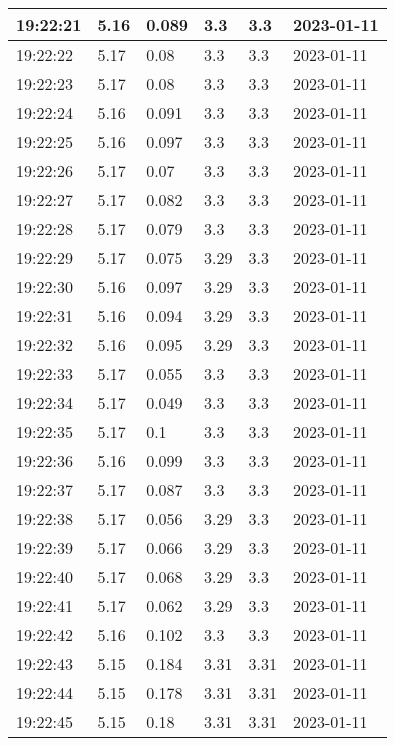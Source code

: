 \begin{longtable}{|l|l|l|l|l|l|}
        19:22:21 & 5.16 & 0.089 & 3.3 & 3.3 & 2023-01-11 \\ \hline
        19:22:22 & 5.17 & 0.08 & 3.3 & 3.3 & 2023-01-11 \\ \hline
        19:22:23 & 5.17 & 0.08 & 3.3 & 3.3 & 2023-01-11 \\ \hline
        19:22:24 & 5.16 & 0.091 & 3.3 & 3.3 & 2023-01-11 \\ \hline
        19:22:25 & 5.16 & 0.097 & 3.3 & 3.3 & 2023-01-11 \\ \hline
        19:22:26 & 5.17 & 0.07 & 3.3 & 3.3 & 2023-01-11 \\ \hline
        19:22:27 & 5.17 & 0.082 & 3.3 & 3.3 & 2023-01-11 \\ \hline
        19:22:28 & 5.17 & 0.079 & 3.3 & 3.3 & 2023-01-11 \\ \hline
        19:22:29 & 5.17 & 0.075 & 3.29 & 3.3 & 2023-01-11 \\ \hline
        19:22:30 & 5.16 & 0.097 & 3.29 & 3.3 & 2023-01-11 \\ \hline
        19:22:31 & 5.16 & 0.094 & 3.29 & 3.3 & 2023-01-11 \\ \hline
        19:22:32 & 5.16 & 0.095 & 3.29 & 3.3 & 2023-01-11 \\ \hline
        19:22:33 & 5.17 & 0.055 & 3.3 & 3.3 & 2023-01-11 \\ \hline
        19:22:34 & 5.17 & 0.049 & 3.3 & 3.3 & 2023-01-11 \\ \hline
        19:22:35 & 5.17 & 0.1 & 3.3 & 3.3 & 2023-01-11 \\ \hline
        19:22:36 & 5.16 & 0.099 & 3.3 & 3.3 & 2023-01-11 \\ \hline
        19:22:37 & 5.17 & 0.087 & 3.3 & 3.3 & 2023-01-11 \\ \hline
        19:22:38 & 5.17 & 0.056 & 3.29 & 3.3 & 2023-01-11 \\ \hline
        19:22:39 & 5.17 & 0.066 & 3.29 & 3.3 & 2023-01-11 \\ \hline
        19:22:40 & 5.17 & 0.068 & 3.29 & 3.3 & 2023-01-11 \\ \hline
        19:22:41 & 5.17 & 0.062 & 3.29 & 3.3 & 2023-01-11 \\ \hline
        19:22:42 & 5.16 & 0.102 & 3.3 & 3.3 & 2023-01-11 \\ \hline
        19:22:43 & 5.15 & 0.184 & 3.31 & 3.31 & 2023-01-11 \\ \hline
        19:22:44 & 5.15 & 0.178 & 3.31 & 3.31 & 2023-01-11 \\ \hline
        19:22:45 & 5.15 & 0.18 & 3.31 & 3.31 & 2023-01-11 \\ \hline

\end{longtable}
